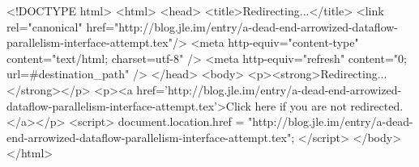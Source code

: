 <!DOCTYPE html>
<html>
<head>
<title>Redirecting...</title>
<link rel="canonical" href="http://blog.jle.im/entry/a-dead-end-arrowized-dataflow-parallelism-interface-attempt.tex"/>
<meta http-equiv="content-type" content="text/html; charset=utf-8" />
<meta http-equiv="refresh" content="0; url=#{destination_path}" />
</head>
<body>
  <p><strong>Redirecting...</strong></p>
  <p><a href='http://blog.jle.im/entry/a-dead-end-arrowized-dataflow-parallelism-interface-attempt.tex'>Click here if you are not redirected.</a></p>
  <script>
    document.location.href = "http://blog.jle.im/entry/a-dead-end-arrowized-dataflow-parallelism-interface-attempt.tex";
  </script>
</body>
</html>
